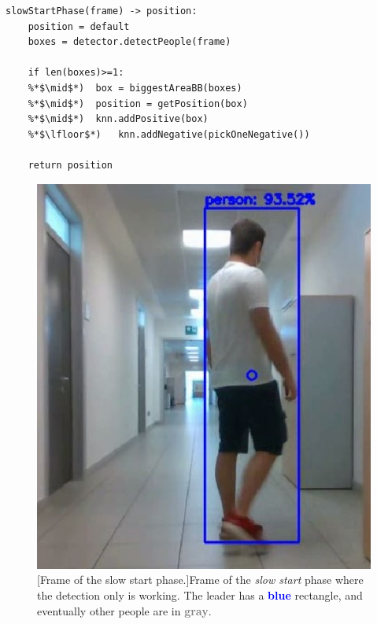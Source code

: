 \begin{lstlisting}[captionpos=b, 
	caption={It is the pseudocode of the first phase. The function \textit{slow start} computes only detections in order to train the KNN people classifier.}, 
	label=alg:slowStartPhase
	]
slowStartPhase(frame) -> position:
	position = default
	boxes = detector.detectPeople(frame)
	
	if len(boxes)>=1:
	%*$\mid$*)	box = biggestAreaBB(boxes)
	%*$\mid$*)	position = getPosition(box)
	%*$\mid$*)	knn.addPositive(box)
	%*$\lfloor$*)	knn.addNegative(pickOneNegative())
	
	return position
\end{lstlisting}
\begin{figure}
	\centering
	\begin{minipage}{.49\textwidth}
		\centering
		\includegraphics[width=1\linewidth]{images/solution/slowStart}
		\captionsetup{margin=0.2cm}
		[Frame of the slow start phase.]{Frame of the \textit{slow start} phase where the detection only is working. The leader has a \textbf{\textcolor{blue}{blue}} rectangle, and eventually other people are in \textbf{\textcolor{gray}{gray}}.}
		\label{fig:slowStart}

\end{minipage}
\end{figure}
